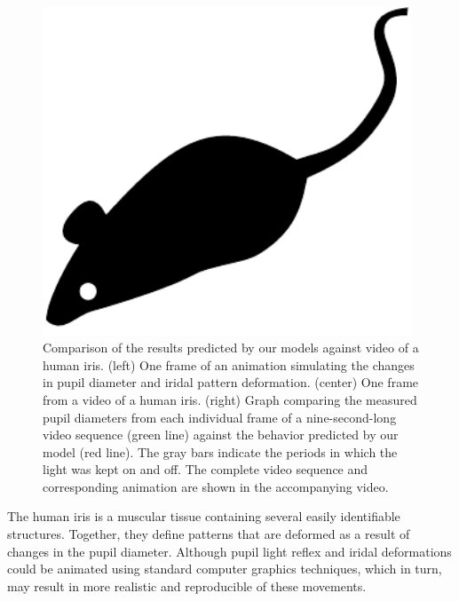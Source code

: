 \documentclass{acmtog} %
\begin{document}
\begin{figure}[t]
\centerline{\includegraphics[width=11cm]{tog-sample-mouse}}
\caption{Comparison of the results predicted by our models against video
of a human iris. (left) One frame of an animation simulating the changes
in pupil diameter and iridal pattern deformation. (center) One frame
from a video of a human iris. (right) Graph comparing the measured pupil
diameters from each individual frame of a nine-second-long video
sequence (green line) against the behavior predicted by our model (red
line). The gray bars indicate the periods in which the light was kept on
and off. The complete video sequence and corresponding animation are
shown in the accompanying video.}
  \label{fig:videocomparison}
\end{figure}

The human iris is a muscular tissue containing several easily
identifiable structures. Together, they define patterns that are
deformed as a result of changes in the pupil diameter. Although pupil
light reflex and iridal deformations could be animated using standard
computer graphics techniques, which in turn, may result in more
realistic and reproducible of these movements.
\end{document}
